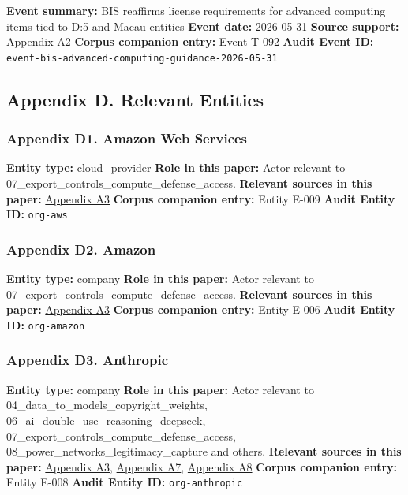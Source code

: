 \documentclass[
  american,
  11pt,
  letterpaper,
]{article}
\begin{document}
\textbf{Event summary:} BIS reaffirms license requirements for advanced
computing items tied to D:5 and Macau entities \textbf{Event date:}
2026-05-31 \textbf{Source support:}
\hyperref[ch-07-appendix-a2-guidance-regarding-enforcement-of-license-requirements-for-advanced-computing-items-for-entities-headquartered-in-country-group-d-5-and-macau]{Appendix
A2} \textbf{Corpus companion entry:} Event T-092 \textbf{Audit Event
ID:} \texttt{event-bis-advanced-computing-guidance-2026-05-31}

\subsection{Appendix D. Relevant
Entities}\label{appendix-d.-relevant-entities-7}

\subsubsection{Appendix D1. Amazon Web
Services}\label{ch-07-appendix-d1-amazon-web-services}

\textbf{Entity type:} cloud\_provider \textbf{Role in this paper:} Actor
relevant to 07\_export\_controls\_compute\_defense\_access.
\textbf{Relevant sources in this paper:}
\hyperref[ch-07-appendix-a3-amazon-and-anthropic-announce-strategic-collaboration-to-advance-generative-ai]{Appendix
A3} \textbf{Corpus companion entry:} Entity E-009 \textbf{Audit Entity
ID:} \texttt{org-aws}

\subsubsection{Appendix D2. Amazon}\label{ch-07-appendix-d2-amazon}

\textbf{Entity type:} company \textbf{Role in this paper:} Actor
relevant to 07\_export\_controls\_compute\_defense\_access.
\textbf{Relevant sources in this paper:}
\hyperref[ch-07-appendix-a3-amazon-and-anthropic-announce-strategic-collaboration-to-advance-generative-ai]{Appendix
A3} \textbf{Corpus companion entry:} Entity E-006 \textbf{Audit Entity
ID:} \texttt{org-amazon}

\subsubsection{Appendix D3.
Anthropic}\label{ch-07-appendix-d3-anthropic}

\textbf{Entity type:} company \textbf{Role in this paper:} Actor
relevant to 04\_data\_to\_models\_copyright\_weights,
06\_ai\_double\_use\_reasoning\_deepseek,
07\_export\_controls\_compute\_defense\_access,
08\_power\_networks\_legitimacy\_capture and others. \textbf{Relevant
sources in this paper:}
\hyperref[ch-07-appendix-a3-amazon-and-anthropic-announce-strategic-collaboration-to-advance-generative-ai]{Appendix
A3},
\hyperref[ch-07-appendix-a7-claude-gov-models-for-u-s-national-security-customers]{Appendix
A7},
\hyperref[ch-07-appendix-a8-anthropic-and-palantir-partner-to-bring-claude-ai-models-to-aws-for-u-s-government-intelligence-and-defense-operations]{Appendix
A8} \textbf{Corpus companion entry:} Entity E-008 \textbf{Audit Entity
ID:} \texttt{org-anthropic}
\end{document}
